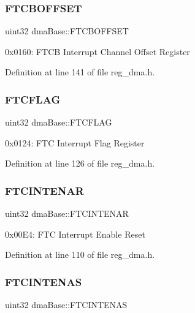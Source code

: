 \subsubsection{\texorpdfstring{F\+T\+C\+B\+O\+F\+F\+S\+ET}{FTCBOFFSET}}
{\footnotesize\ttfamily uint32 dma\+Base\+::\+F\+T\+C\+B\+O\+F\+F\+S\+ET}

0x0160\+: F\+T\+CB Interrupt Channel Offset Register 

Definition at line 141 of file reg\+\_\+dma.\+h.

\mbox{\label{structdmaBase_a3410b86ad513a93b0d0329fb6143142d}} 
\subsubsection{\texorpdfstring{F\+T\+C\+F\+L\+AG}{FTCFLAG}}
{\footnotesize\ttfamily uint32 dma\+Base\+::\+F\+T\+C\+F\+L\+AG}

0x0124\+: F\+TC Interrupt Flag Register 

Definition at line 126 of file reg\+\_\+dma.\+h.

\mbox{\label{structdmaBase_afca6819e531e1b0e4195e83e97c87c46}} 
\subsubsection{\texorpdfstring{F\+T\+C\+I\+N\+T\+E\+N\+AR}{FTCINTENAR}}
{\footnotesize\ttfamily uint32 dma\+Base\+::\+F\+T\+C\+I\+N\+T\+E\+N\+AR}

0x00\+E4\+: F\+TC Interrupt Enable Reset 

Definition at line 110 of file reg\+\_\+dma.\+h.

\mbox{\label{structdmaBase_a1e56811bb3b610c905b05dc8227bb8fb}} 
\subsubsection{\texorpdfstring{F\+T\+C\+I\+N\+T\+E\+N\+AS}{FTCINTENAS}}
{\footnotesize\ttfamily uint32 dma\+Base\+::\+F\+T\+C\+I\+N\+T\+E\+N\+AS}

